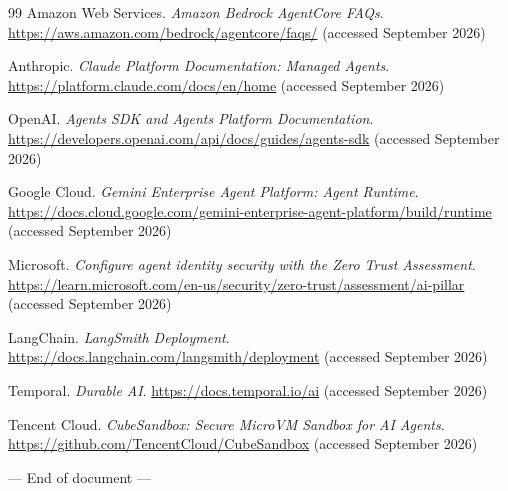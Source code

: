 \clearpage
\begingroup
\raggedright
\sloppy
\begin{thebibliography}{99}
\small
{}
Amazon Web Services. \emph{Amazon Bedrock AgentCore FAQs}.\newblock
\url{https://aws.amazon.com/bedrock/agentcore/faqs/} (accessed September 2026)

Anthropic. \emph{Claude Platform Documentation: Managed Agents}.\newblock
\url{https://platform.claude.com/docs/en/home} (accessed September 2026)

OpenAI. \emph{Agents SDK and Agents Platform Documentation}.\newblock
\url{https://developers.openai.com/api/docs/guides/agents-sdk} (accessed September 2026)

Google Cloud. \emph{Gemini Enterprise Agent Platform: Agent Runtime}.\newblock
\url{https://docs.cloud.google.com/gemini-enterprise-agent-platform/build/runtime} (accessed September 2026)

Microsoft. \emph{Configure agent identity security with the Zero Trust Assessment}.\newblock
\url{https://learn.microsoft.com/en-us/security/zero-trust/assessment/ai-pillar} (accessed September 2026)

LangChain. \emph{LangSmith Deployment}.\newblock
\url{https://docs.langchain.com/langsmith/deployment} (accessed September 2026)

Temporal. \emph{Durable AI}.\newblock
\url{https://docs.temporal.io/ai} (accessed September 2026)

Tencent Cloud. \emph{CubeSandbox: Secure MicroVM Sandbox for AI Agents}.\newblock
\url{https://github.com/TencentCloud/CubeSandbox} (accessed September 2026)
\end{thebibliography}
\endgroup

\vfill
\begin{center}
  \color{Muted}\small
  --- End of document ---
\end{center}
